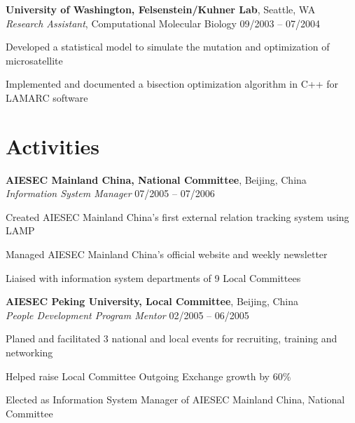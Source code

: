 \documentclass[margin,line]{resume}
\begin{document}
\begin{resume}
    \textbf{University of Washington, Felsenstein/Kuhner Lab}, Seattle, WA \\
    \textsl{Research Assistant}, Computational Molecular Biology \hfill 09/2003 -- 07/2004  \vspace{-3mm}\\\vspace{-1mm}%
      \begin{list2}
      \item Developed a statistical model to simulate the mutation and optimization of microsatellite 
      \item Implemented and documented a bisection optimization algorithm in C++ for LAMARC software 
      \end{list2}
      
    \section{\mysidestyle Activities}

    \textbf{AIESEC Mainland China, National Committee}, Beijing, China \\
    \textsl{Information System Manager} \hfill 07/2005 -- 07/2006 \vspace{-3mm}\\\vspace{-1mm}%
      \begin{list2}
      \item Created AIESEC Mainland China's first external relation tracking system using LAMP
      \item Managed AIESEC Mainland China's official website and weekly newsletter 
      \item Liaised with information system departments of 9 Local Committees 
      \end{list2}

    \textbf{AIESEC Peking University, Local Committee}, Beijing, China \\
    \textsl{People Development Program Mentor} \hfill 02/2005 -- 06/2005  \vspace{-3mm}\\\vspace{-1mm}%
      \begin{list2}
      \item Planed and facilitated 3 national and local events for recruiting, training and networking 
      \item Helped raise Local Committee Outgoing Exchange growth by 60\% 
      \item Elected as Information System Manager of AIESEC Mainland China, National Committee
      \end{list2}


\end{resume}
\end{document}
